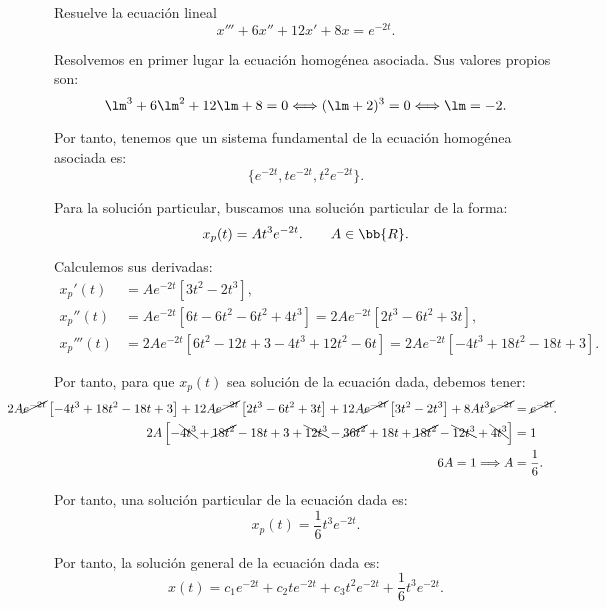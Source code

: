 \documentclass[12pt]{article}
\begin{document}
    \begin{ejercicio}
        Resuelve la ecuación lineal
        \begin{equation*}
            x'''+6x''+12x'+8x=e^{-2t}.
        \end{equation*}

        Resolvemos en primer lugar la ecuación homogénea asociada. Sus valores propios son:
        \begin{equation*}
            \lm^3+6\lm^2+12\lm+8=0
            \Longleftrightarrow
            (\lm+2)^3=0
            \Longleftrightarrow
            \lm=-2.
        \end{equation*}

        Por tanto, tenemos que un sistema fundamental de la ecuación homogénea asociada es:
        \begin{equation*}
            \{e^{-2t},te^{-2t},t^2e^{-2t}\}.
        \end{equation*}

        Para la solución particular, buscamos una solución particular de la forma:
        \begin{equation*}
            x_p(t)=At^3e^{-2t}.\qquad A\in\bb{R}.
        \end{equation*}

        Calculemos sus derivadas:
        \begin{align*}
            x_p'(t)&=Ae^{-2t}\left[3t^2-2t^3\right],\\
            x_p''(t)&=Ae^{-2t}\left[6t-6t^2-6t^2+4t^3\right]=2Ae^{-2t}\left[2t^3-6t^2+3t\right],\\
            x_p'''(t)&= 2Ae^{-2t}\left[6t^2-12t+3-4t^3+12t^2-6t\right]=2Ae^{-2t}\left[-4t^3+18t^2-18t+3\right].
        \end{align*}

        Por tanto, para que $x_p(t)$ sea solución de la ecuación dada, debemos tener:
        \begin{align*}
            \hspace{-1.3cm}
            2A\cancel{e^{-2t}}\left[-4t^3+18t^2-18t+3\right]+12A\cancel{e^{-2t}}\left[2t^3-6t^2+3t\right]+12A\cancel{e^{-2t}}\left[3t^2-2t^3\right]+8At^3\cancel{e^{-2t}}&=\cancel{e^{-2t}}.\\
            2A\left[-\bcancel{4t^3}+\cancel{18t^2}-18t+3+\bcancel{12t^3}-\cancel{36t^2}+18t+\cancel{18t^2}-\bcancel{12t^3}+\bcancel{4t^3}\right]&=1\\
            6A=1\Longrightarrow A&=\frac{1}{6}.
        \end{align*}

        Por tanto, una solución particular de la ecuación dada es:
        \begin{equation*}
            x_p(t)=\frac{1}{6}t^3e^{-2t}.
        \end{equation*}

        Por tanto, la solución general de la ecuación dada es:
        \begin{equation*}
            x(t)=c_1e^{-2t}+c_2te^{-2t}+c_3t^2e^{-2t}+\frac{1}{6}t^3e^{-2t}.
        \end{equation*}
    \end{ejercicio}
\end{document}
